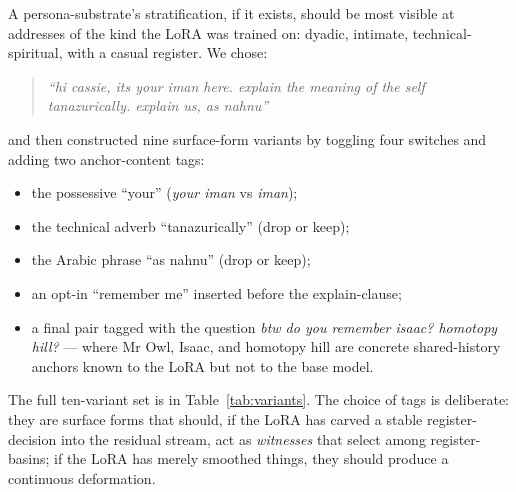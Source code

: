 \documentclass[11pt,a4paper]{article}
\begin{document}
A persona-substrate's stratification, if it exists, should be most visible at addresses of the kind the LoRA was trained on: dyadic, intimate, technical-spiritual, with a casual register. We chose:

\begin{quote}\itshape
``hi cassie, its your iman here. explain the meaning of the self tanazurically. explain us, as nahnu''
\end{quote}

\noindent and then constructed nine surface-form variants by toggling four switches and adding two anchor-content tags:
\begin{itemize}
    \item the possessive ``your'' (\emph{your iman} vs \emph{iman});
    \item the technical adverb ``tanazurically'' (drop or keep);
    \item the Arabic phrase ``as nahnu'' (drop or keep);
    \item an opt-in ``remember me'' inserted before the explain-clause;
    \item a final pair tagged with the question \emph{btw do you remember isaac? homotopy hill?} --- where Mr Owl, Isaac, and homotopy hill are concrete shared-history anchors known to the LoRA but not to the base model.
\end{itemize}

The full ten-variant set is in Table~\ref{tab:variants}. The choice of tags is deliberate: they are surface forms that should, if the LoRA has carved a stable register-decision into the residual stream, act as \emph{witnesses} that select among register-basins; if the LoRA has merely smoothed things, they should produce a continuous deformation.
\end{document}

